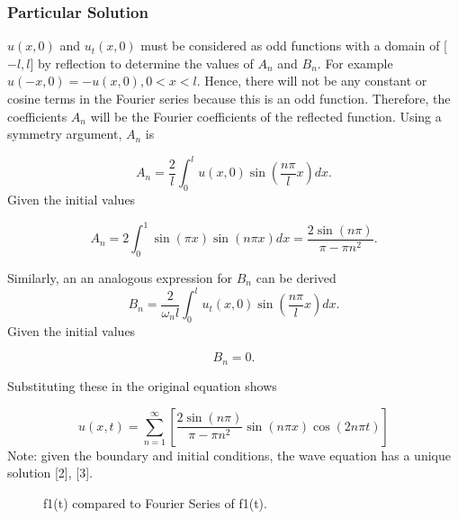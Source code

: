 \documentclass{article}
\begin{document}
\subsubsection{Particular Solution}
$u(x,0)$  and $u_t(x,0)$ must be considered as odd functions with a domain of [$-l,l$] by reflection to determine the values of $A_n$ and $B_n$. For example $u(-x,0) = -u(x,0), 0 < x < l$. Hence, there will not be any constant or cosine terms in the Fourier series because this is an odd function. Therefore, the coefficients $A_n$ will be the Fourier coefficients of the reflected function. Using a symmetry argument, $A_n$ is 

\begin{equation*}
A_n=\frac{2}{l} \int_0^l u(x,0)\sin(\frac{n\pi}{l}x)dx.
\end{equation*}
Given the initial values

\begin{equation*}
A_n=2 \int_0^1  \sin(\pi x)\sin(n\pi x) dx =\frac{2\sin(n\pi)}{\pi -\pi n^2}.
\end{equation*}

Similarly, an an analogous expression for $B_n$ can be derived
\begin{equation*}
B_n = \frac{2}{\omega_n l} \int_0^l u_t(x,0)\sin(\frac{n\pi}{l}x)dx.
\end{equation*}Given the initial values

\begin{equation*}
B_n=0.
\end{equation*}

Substituting these in the original equation shows

\begin{equation*}
	u(x,t)=\sum_{n=1}^{\infty}[\frac{2\sin(n\pi)}{\pi -\pi n^2} \sin(n\pi x)\cos(2n\pi t)]
\end{equation*}
Note: given the boundary and initial conditions, the wave equation has a unique solution [2], [3].

\begin{figure}
    \centering
    \qquad
    \caption{f1(t) compared to Fourier Series of f1(t).}
    \label{fig:f1-a}
\end{figure}
\end{document}

